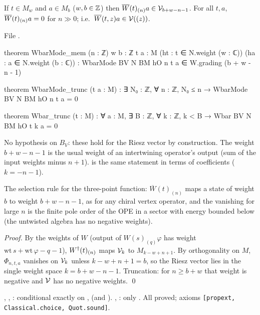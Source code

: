 \begin{theorem}\label{ch09:thm:Wbargrade}
If $t\in M_w$ and $a\in M_b$ ($w,b\in{\mathbb{Z}}$) then $\overline{W}(t)_{(n)}a\in\mathcal{V}_{b+w-n-1}$. For all $t,a$,
$\overline{W}(t)_{(n)}a=0$ for $n\gg0$; i.e.\ $\overline{W}(t,z)a\in\mathcal{V}((z))$.
\end{theorem}
\noindent File .
\begin{leancode}
theorem WbarMode_mem (n : ℤ) {w b : ℤ} {t a : M} (ht : t ∈ N.weight (w : ℂ))
    (ha : a ∈ N.weight (b : ℂ)) : WbarMode BV N BM hO n t a ∈ W.grading (b + w - n - 1)

theorem WbarMode_trunc (t a : M) : ∃ N₀ : ℤ, ∀ n : ℤ, N₀ ≤ n → WbarMode BV N BM hO n t a = 0

theorem Wbar_trunc (t : M) : ∀ a : M, ∃ B : ℤ, ∀ k : ℤ, k < B → Wbar BV N BM hO t k a = 0
\end{leancode}
\begin{dictionary}
No hypothesis on $B_V$: these hold for the Riesz vector by construction. The weight
$b+w-n-1$ is the usual weight of an intertwining operator's output (sum of the input weights minus
$n+1$).  is the same statement in terms of coefficients ($k=-n-1$).
\end{dictionary}
\begin{physics}
The selection rule for the three-point function: $\overline W(t)_{(n)}$ maps a state of weight $b$ to weight $b+w-n-1$, as for any chiral vertex operator, and the vanishing for large $n$ is the finite pole order of the OPE in a sector with energy bounded below (the untwisted algebra has no negative weights).
\end{physics}

\noindent\emph{Proof.} By the weights of $W$ (output of $W(s)_{(q)}\varphi$ has weight
$\mathrm{wt}\,s+\mathrm{wt}\,\varphi-q-1$), $W^{\dagger}(t)_{(n)}$ maps $\mathcal{V}_k$ to $M_{k-w+n+1}$. By
orthogonality on $M$, $\Phi_{n,t,a}$ vanishes on $\mathcal{V}_k$ unless $k-w+n+1=b$, so the Riesz vector
lies in the single weight space $k=b+w-n-1$. Truncation: for $n\ge b+w$ that weight is negative and
$\mathcal{V}$ has no negative weights. \qed

\begin{status}
, , : conditional exactly on
,  (and ). , : only .
All proved; axioms \texttt{[propext, Classical.choice, Quot.sound]}.
\end{status}

